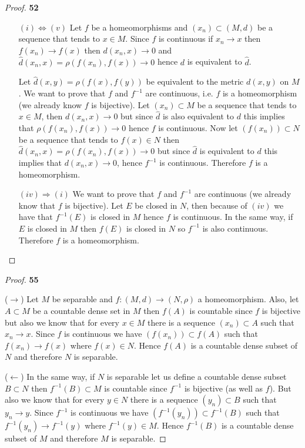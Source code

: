 \documentclass[11pt]{article}
\theoremstyle{definition}
\begin{document}
\begin{proof}{\textbf{52}}
\begin{itemize}
            \item [$(i) \Leftrightarrow (v)$] Let $f$ be a homeomorphisms and
            $(x_n) \subset (M,d)$ be a sequence that tends to $x \in M$.
            Since $f$ is continuous if $x_n \to x$ then $f(x_n) \to f(x)$ then
            $d(x_n,x) \to 0$ and $\hat{d}(x_n,x) = \rho(f(x_n), f(x)) \to 0$
            hence $d$ is equivalent to $\hat{d}$.

            Let $\hat{d}(x,y) = \rho(f(x),f(y))$ be equivalent to the metric
            $d(x,y)$ on $M$. We want to prove that $f$ and $f^{-1}$ are
            continuous, i.e. $f$ is a homeomorphism (we already know $f$ is
            bijective). Let $(x_n) \subset M$ be a sequence that tends to
            $x \in M$, then $d(x_n,x) \to 0$ but since $\hat{d}$ is also
            equivalent to $d$ this implies that $\rho(f(x_n), f(x)) \to 0$
            hence $f$ is continuous.
            Now let $(f(x_n)) \subset N$ be a sequence that tends to
            $f(x) \in N$ then $\hat{d}(x_n,x) = \rho(f(x_n), f(x)) \to 0$ but
            since $\hat{d}$ is equivalent to $d$ this implies that
            $d(x_n,x) \to 0$, hence $f^{-1}$ is continuous. Therefore $f$ is a
            homeomorphism.

            \item [$(iv) \Rightarrow (i)$]  We want to prove that $f$ and
            $f^{-1}$ are continuous (we already know that $f$ is bijective).
            Let $E$ be closed in $N$, then because of $(iv)$ we have that
            $f^{-1}(E)$ is closed in $M$ hence $f$ is continuous.
            In the same way, if $E$ is closed in $M$ then $f(E)$ is closed in
            $N$ so $f^{-1}$ is also continuous. Therefore $f$ is a
            homeomorphism. 
        \end{itemize}
    \end{proof}
    \begin{proof}{\textbf{55}}

        ($\rightarrow$) Let $M$ be separable and $f:(M,d) \to (N,\rho)$ a
        homeomorphism. Also, let $A \subset M$ be a countable dense set in $M$
        then $f(A)$ is countable since $f$ is bijective but also we know that
        for every $x \in M$ there is a sequence $(x_n) \subset A$ such that
        $x_n \to x$. Since $f$ is continuous we have $(f(x_n)) \subset f(A)$
        such that $f(x_n) \to f(x)$ where $f(x) \in N$. Hence $f(A)$ is a
        countable dense subset of $N$ and therefore $N$ is separable.

        ($\leftarrow$) In the same way, if $N$ is separable let us define a
        countable dense subset $B \subset N$ then $f^{-1}(B) \subset M$ is
        countable since $f^{-1}$ is bijective (as well as $f$). But also we
        know that for every $y \in N$ there is a sequence $(y_n) \subset B$
        such that $y_n \to y$. Since $f^{-1}$ is continuous we have 
        $(f^{-1}(y_n)) \subset f^{-1}(B)$ such that $f^{-1}(y_n) \to f^{-1}(y)$
        where $f^{-1}(y) \in M$. Hence $f^{-1}(B)$ is a countable dense subset
        of $M$ and therefore $M$ is separable. 
    \end{proof}
\end{document}
